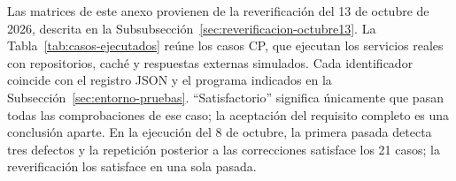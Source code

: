 \label{annex:casos-prueba}

Las matrices de este anexo provienen de la reverificación del 13 de octubre de 2026, descrita en la Subsubsección~\ref{sec:reverificacion-octubre13}. La Tabla~\ref{tab:casos-ejecutados} reúne los casos CP, que ejecutan los servicios reales con repositorios, caché y respuestas externas simulados. Cada identificador coincide con el registro JSON y el programa indicados en la Subsección~\ref{sec:entorno-pruebas}. \enquote{Satisfactorio} significa únicamente que pasan todas las comprobaciones de ese caso; la aceptación del requisito completo es una conclusión aparte. En la ejecución del 8 de octubre, la primera pasada detecta tres defectos y la repetición posterior a las correcciones satisface los 21 casos; la reverificación los satisface en una sola pasada.

